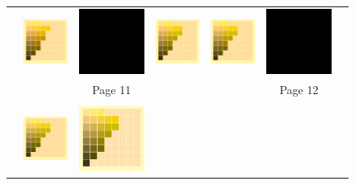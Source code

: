\begin{figure}[t!]
{\begin{tabular}{ccccccc}
			&
			\includegraphics[width=.155\linewidth]{img/results_uplift_page11_ourFL11.png}
			& 
			\includegraphics[width=.155\linewidth]{img/toDelete.png}
			&\quad
			\includegraphics[width=.155\linewidth]{img/results_uplift_page12_originalFL11.png}
			&
			\includegraphics[width=.155\linewidth]{img/results_uplift_page12_ourFL11.png}
			&
			\includegraphics[width=.155\linewidth]{img/toDelete.png}\\
			& & Page 11 & & & Page 12 & \\
			\vspace{0.1em} \\ 
			\raisebox{0.4cm}[0pt][0pt]{\parbox[c][0pt][c]{0cm}{\hspace{-1.5em}\\[20pt]}\par}
			&\includegraphics[width=.155\linewidth]{img/results_uplift_page13_originalFL11.png}
			&
			\includegraphics[width=.155\linewidth]{img/results_uplift_page13_sigmoidFL11.png}

\end{tabular}}
\end{figure}
